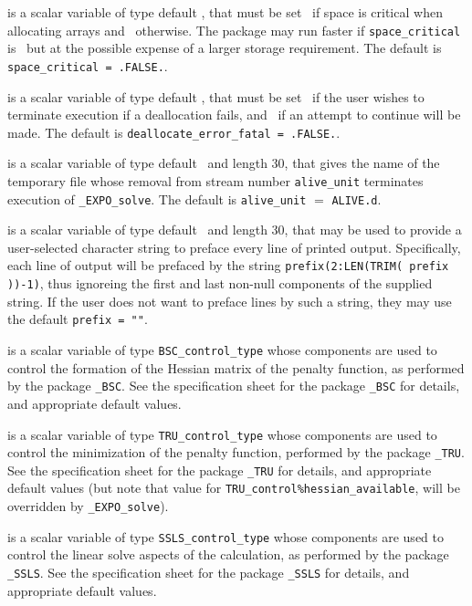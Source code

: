 \documentclass{galahad}
\newcommand{\packagename}{EXPO}
\newcommand{\fullpackagename}{\libraryname\_\packagename}
\newcommand{\solver}{{\tt \fullpackagename\_solve}}
\begin{document}
\begin{description}
 is a scalar variable of type default \logical,
that must be set \true\ if space is critical when allocating arrays
and  \false\ otherwise. The package may run faster if
{\tt space\_critical} is \false\ but at the possible expense of a larger
storage requirement. The default is {\tt space\_critical = .FALSE.}.

 is a scalar variable of type default \logical,
that must be set \true\ if the user wishes to terminate execution if
a deallocation  fails, and \false\ if an attempt to continue
will be made. The default is {\tt deallocate\_error\_fatal = .FALSE.}.

 is a scalar variable of type default \character\ and length
30, that gives the name of the temporary file whose removal from stream number
{\tt alive\_unit} terminates execution of \solver.
The default is {\tt alive\_unit} $=$ {\tt ALIVE.d}.

 is a scalar variable of type default \character\
and length 30, that may be used to provide a user-selected
character string to preface every line of printed output.
Specifically, each line of output will be prefaced by the string
{\tt prefix(2:LEN(TRIM( prefix ))-1)},
thus ignoreing the first and last non-null components of the
supplied string. If the user does not want to preface lines by such
a string, they may use the default {\tt prefix = ""}.

 is a scalar variable of type
{\tt BSC\_control\_type}
whose components are used to control the formation of the Hessian matrix
of the penalty function, as performed by the package
{\tt \libraryname\_BSC}.
See the specification sheet for the package
{\tt \libraryname\_BSC}
for details, and appropriate default values.

 is a scalar variable of type
{\tt TRU\_control\_type}
whose components are used to control the
minimization of the penalty function,
performed by the package
{\tt \libraryname\_TRU}.
See the specification sheet for the package
{\tt \libraryname\_TRU}
for details, and appropriate default values
(but note that value for
{\tt TRU\_control\%hessian\_available},
will be overridden by \solver).

 is a scalar variable of type
{\tt SSLS\_control\_type}
whose components are used to control the linear solve
aspects of the calculation, as performed by the package
{\tt \libraryname\_SSLS}.
See the specification sheet for the package
{\tt \libraryname\_SSLS}
for details, and appropriate default values.

\end{description}
\end{document}
